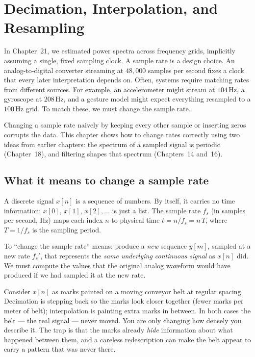 \chapter{Decimation, Interpolation, and Resampling}

In Chapter~21, we estimated power spectra across frequency grids, implicitly assuming a single, fixed sampling clock. A sample rate is a design choice. An analog-to-digital converter streaming at $48{,}000$ samples per second fixes a clock that every later interpretation depends on. Often, systems require matching rates from different sources. For example, an accelerometer might stream at $104$\,Hz, a gyroscope at $208$\,Hz, and a gesture model might expect everything resampled to a $100$\,Hz grid. To match these, we must change the sample rate.

Changing a sample rate naively by keeping every other sample or inserting zeros corrupts the data. This chapter shows how to change rates correctly using two ideas from earlier chapters: the spectrum of a sampled signal is periodic (Chapter~18), and filtering shapes that spectrum (Chapters~14 and~16).

\section{What it means to change a sample rate}
\label{ch22:meaning}

A discrete signal $x[n]$ is a sequence of numbers. By itself, it carries no time information: $x[0]$, $x[1]$, $x[2], \dots$ is just a list.
The sample rate $f_s$ (in samples per second, Hz) maps each index $n$ to physical time $t = n/f_s = n\,T$, where $T = 1/f_s$ is the sampling period.

To ``change the sample rate'' means: produce a \emph{new} sequence $y[m]$,
sampled at a new rate $f_s'$, that represents the \emph{same underlying
continuous signal} as $x[n]$ did. We must compute the values that the original analog waveform would have produced if we had sampled it at the new rate.

\begin{intuitionbox}
Consider $x[n]$ as marks painted on a moving conveyor belt at regular spacing. Decimation is stepping back so the marks look closer together (fewer
marks per meter of belt); interpolation is painting extra marks in between. In
both cases the belt --- the real signal --- never moved. You are only changing
how densely you describe it. The trap is that the marks already \emph{hide}
information about what happened between them, and a careless redescription can
make the belt appear to carry a pattern that was never there.
\end{intuitionbox}

